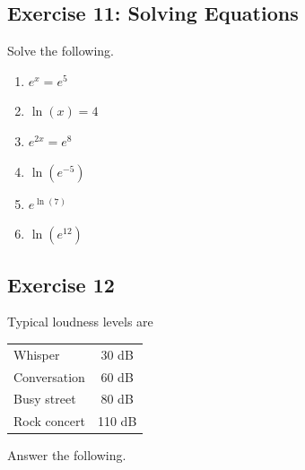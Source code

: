\documentclass[a4paper, 11pt]{article}
\begin{document}
\subsection*{Exercise 11: Solving Equations}

Solve the following.

\begin{enumerate}
    \item $e^x=e^5$

    \vspace{1cm}

    \item $\ln(x)=4$

    \vspace{1cm}

    \item $e^{2x}=e^8$

    \vspace{1cm}

    \item $\ln(e^{-5})$

    \vspace{1cm}

    \item $e^{\ln(7)}$

    \vspace{1cm}

    \item $\ln(e^{12})$

    \vspace{1cm}
\end{enumerate}


\subsection*{Exercise 12}

Typical loudness levels are

\begin{center}
\begin{tabular}{l|c}
Whisper & 30 dB\\
Conversation & 60 dB\\
Busy street & 80 dB\\
Rock concert & 110 dB
\end{tabular}
\end{center}

Answer the following.
\end{document}
